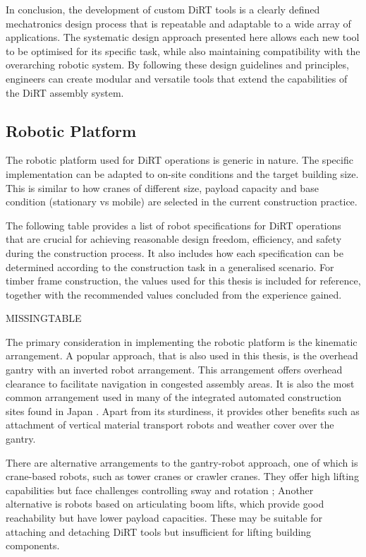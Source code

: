 In conclusion, the development of custom DiRT tools is a clearly defined mechatronics design process that is repeatable and adaptable to a wide array of applications. The systematic design approach presented here allows each new tool to be optimised for its specific task, while also maintaining compatibility with the overarching robotic system. By following these design guidelines and principles, engineers can create modular and versatile tools that extend the capabilities of the DiRT assembly system. 

\subsection{Robotic Platform}
\label{subsection:discussion-robotic-platform}

The robotic platform used for DiRT operations is generic in nature. The specific implementation can be adapted to on-site conditions and the target building size. This is similar to how cranes of different size, payload capacity and base condition (stationary vs mobile) are selected in the current construction practice. 

The following table provides a list of robot specifications for DiRT operations that are crucial for achieving reasonable design freedom, efficiency, and safety during the construction process. It also includes how each specification can be determined according to the construction task in a generalised scenario. For timber frame construction, the values used for this thesis is included for reference, together with the recommended values concluded from the experience gained.

MISSINGTABLE

The primary consideration in implementing the robotic platform is the kinematic arrangement. A popular approach, that is also used in this thesis, is the overhead gantry with an inverted robot arrangement. This arrangement offers overhead clearance to facilitate navigation in congested assembly areas. It is also the most common arrangement used in many of the integrated automated construction sites found in Japan \parencite{linnerAutomatedRoboticConstruction2013, potterJapanSkyscraperFactories2022}. Apart from its sturdiness, it provides other benefits such as attachment of vertical material transport robots and weather cover over the gantry.

There are alternative arrangements to the gantry-robot approach, one of which is crane-based robots, such as tower cranes or crawler cranes. They offer high lifting capabilities but face challenges controlling sway \parencite{neupertTrackingAntiswayControl2010} and rotation \parencite{liangRASRoboticAssembly2017}; Another alternative is robots based on articulating boom lifts, which provide good reachability but have lower payload capacities. These may be suitable for attaching and detaching DiRT tools but insufficient for lifting building components. 

